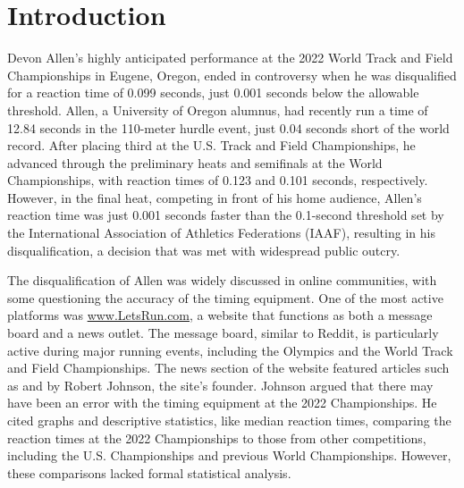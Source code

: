 \documentclass[12pt, letterpaper]{article}
\begin{document}
\doublespace


\section{Introduction}
\label{sec:intro}

Devon Allen’s highly anticipated performance at the 2022 World 
Track and Field Championships in Eugene, Oregon, ended in 
controversy when he was disqualified for a reaction time of 
0.099 seconds, just 0.001 seconds below the allowable threshold.
Allen, a University of Oregon alumnus, 
had recently run a time of 12.84 seconds in the 110-meter hurdle 
event, just 0.04 seconds short of the world record. After placing 
third at the U.S. Track and Field Championships, he advanced 
through the preliminary heats and semifinals at the World 
Championships, with reaction times of 0.123 and 0.101 seconds, 
respectively. However, in the final heat, competing in front of his 
home audience, Allen’s reaction time was just 0.001 seconds faster 
than the 0.1-second threshold set by the International Association 
of Athletics Federations (IAAF), resulting in his disqualification, a 
decision that was met with widespread public outcry.


The disqualification of Allen was widely discussed in online 
communities, with some questioning the accuracy of the timing 
equipment. One of the most active platforms was \url{www.LetsRun.com}, 
a website that functions as both a message board and a news outlet. 
The message board, similar to Reddit, is particularly active during 
major running events, including the Olympics and the World Track 
and Field Championships. The news section of the website featured 
articles such as \citep{johnson2022data} and \citep{johnson2022was} 
by Robert Johnson, the site’s founder. Johnson argued that there may 
have been an error with the timing equipment at the 2022 Championships. 
He cited graphs and descriptive statistics, like median reaction 
times, comparing the reaction times at the 2022 Championships to 
those from other competitions, including the U.S. Championships and 
previous World Championships. However, these comparisons lacked formal 
statistical analysis. 
\end{document}
